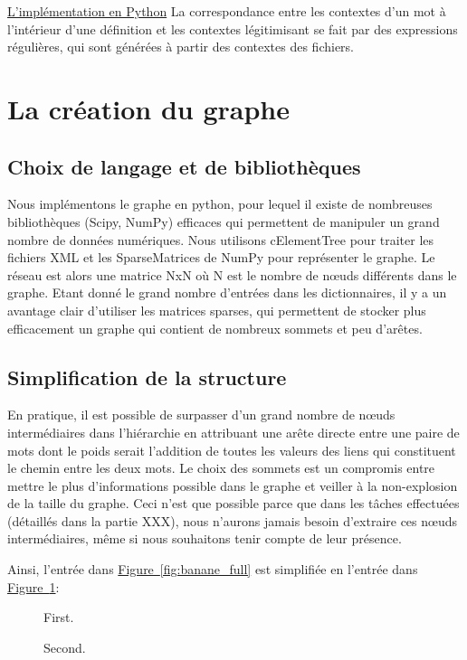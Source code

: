 \documentclass[a4paper, 12pt]{article}
\begin{document}
\underline{L'implémentation en Python}\newline
La correspondance entre les contextes d'un mot à l'intérieur d'une définition et les contextes légitimisant se fait par des expressions régulières, qui sont générées à partir des contextes des fichiers.

\section{La création du graphe}

\subsection{Choix de langage et de bibliothèques}
Nous implémentons le graphe en python, pour lequel il existe de nombreuses bibliothèques (Scipy, NumPy) efficaces qui permettent de manipuler un grand nombre de données numériques. Nous utilisons cElementTree pour traiter les fichiers XML et les SparseMatrices de NumPy pour représenter le graphe. Le réseau est alors une matrice NxN où N est le nombre de nœuds différents dans le graphe. Etant donné le grand nombre d'entrées dans les dictionnaires, il y a un avantage clair d'utiliser les matrices sparses, qui permettent de stocker plus efficacement un graphe qui contient de nombreux sommets et peu d'arêtes.

\subsection{Simplification de la structure}
En pratique, il est possible de surpasser d'un grand nombre de nœuds intermédiaires dans l'hiérarchie en attribuant une arête directe entre une paire de mots dont le poids serait l'addition de toutes les valeurs des liens qui constituent le chemin entre les deux mots. Le choix des sommets est un compromis entre mettre le plus d'informations possible dans le graphe et veiller à la non-explosion de la taille du graphe. Ceci n'est que possible parce que dans les tâches effectuées (détaillés dans la partie XXX), nous n'aurons jamais besoin d'extraire ces nœuds intermédiaires, même si nous souhaitons tenir compte de leur présence.

Ainsi, l'entrée dans \hyperref[fig:banane_full]{Figure~\ref*{fig:banane_full}} est simplifiée en l'entrée dans \hyperref[fig:banane_simple]{Figure~\ref*{fig:banane_simple}}:

\begin{figure}
\centering
\parbox{5cm}{
\def\svgscale{0.5}
%

\caption{First.}
\label{fig:banane_full}}
\qquad
\begin{minipage}{5cm}
\def\svgscale{0.5}
%

\caption{Second.}
\label{fig:banane_simple}
\end{minipage}
\end{figure}
\end{document}
